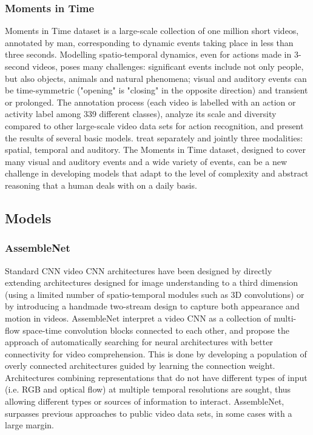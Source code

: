 \subsubsection{Moments in Time}
Moments in Time\cite{momentsintime} dataset is a large-scale collection of one million short videos, annotated by man, corresponding to dynamic events taking place in less than three seconds. Modelling spatio-temporal dynamics, even for actions made in 3-second videos, poses many challenges: significant events include not only people, but also objects, animals and natural phenomena; visual and auditory events can be time-symmetric ("opening" is "closing" in the opposite direction) and transient or prolonged. The annotation process (each video is labelled with an action or activity label among 339 different classes), analyze its scale and diversity compared to other large-scale video data sets for action recognition, and present the results of several basic models. treat separately and jointly three modalities: spatial, temporal and auditory. The Moments in Time dataset, designed to cover many visual and auditory events and a wide variety of events, can be a new challenge in developing models that adapt to the level of complexity and abstract reasoning that a human deals with on a daily basis.

\pagebreak\subsection{Models}
\subsubsection{AssembleNet}
Standard CNN video CNN architectures have been designed by directly extending architectures designed for image understanding to a third dimension (using a limited number of spatio-temporal modules such as 3D convolutions) or by introducing a handmade two-stream design to capture both appearance and motion in videos. AssembleNet\cite{assemblenet} interpret a video CNN as a collection of multi-flow space-time convolution blocks connected to each other, and propose the approach of automatically searching for neural architectures with better connectivity for video comprehension. This is done by developing a population of overly connected architectures guided by learning the connection weight. Architectures combining representations that do not have different types of input (i.e. RGB and optical flow) at multiple temporal resolutions are sought, thus allowing different types or sources of information to interact. AssembleNet, surpasses previous approaches to public video data sets, in some cases with a large margin.

